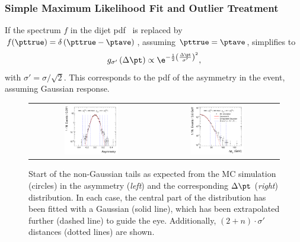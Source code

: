 \subsubsection{Simple Maximum Likelihood Fit and Outlier Treatment}\label{sec:ResFit:DataDriven:SimpleFit}

If the spectrum $f$ in the dijet pdf~ is replaced by \mbox{$f(\pttrue)  = \delta\left(\pttrue - \ptave\right)$}, \ie assuming \mbox{$\pttrue = \ptave$}, 
 simplifies to
\begin{equation}
\label{eq:ResFit::DijetPdfTransformed:Simple}
  g_{\sigma'}\left(\Delta\pt\right) \propto
  \e^{-\frac{1}{2}\left(\frac{\Delta\pt}{\sigma'}\right)^{2}}, 
\end{equation}
with \mbox{$\sigma' = \sigma/\sqrt{2}$}.
This corresponds to the pdf of the asymmetry in the event, assuming
Gaussian response.

\begin{figure}[ht]
 \centering
  \begin{tabular}{cc}
    \includegraphics[width=0.45\textwidth]{figures/hTailsPtAsym} &
    \includegraphics[width=0.45\textwidth]{figures/hTailsDeltaPt} \\
\end{tabular}
 \caption{Start of the non-Gaussian tails as expected from the MC simulation (circles) in the asymmetry (\textit{left}) and the corresponding \mbox{$\Delta\pt$} (\textit{right}) distribution.
   In each case, the central part of the distribution has been fitted with a Gaussian (solid line), which has been extrapolated further (dashed line) to guide the eye.
   Additionally, \mbox{$(2+n)\cdot\sigma'$} distances (dotted lines) are shown.}
  \label{fig:ResFit:DataDriven:Tails}
\end{figure}

